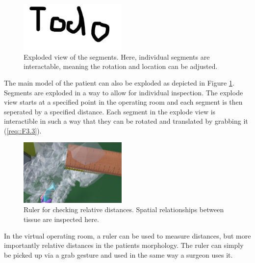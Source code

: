 \begin{figure}[ht]
  \centering
  \includegraphics[width=200px]{images/todo.png}
  \caption{\label{fig::ExplodeView} Exploded view of the segments. Here, individual segments are interactable, meaning the rotation and location can be adjusted.}
\end{figure}

The main model of the patient can also be exploded as depicted in Figure \ref{fig::ExplodeView}.
Segments are exploded in a way to allow for individual inspection.
The explode view starts at a specified point in the operating room and each segment is then seperated by a specified distance.
Each segment in the explode view is interactible in such a way that they can be rotated and translated by grabbing it (\ref{req::F3.3}).

\begin{figure}[ht]
    \centering
    \includegraphics[width=200px]{images/implementation/features/visualization/ruler.png}
    \caption{\label{fig::FeatureRuler} Ruler for checking relative distances. Spatial relationships between tissue are inspected here.}
\end{figure}

In the virtual operating room, a ruler can be used to measure distances, but more importantly relative distances in the patients morphology.
The ruler can simply be picked up via a grab gesture and used in the same way a surgeon uses it.
